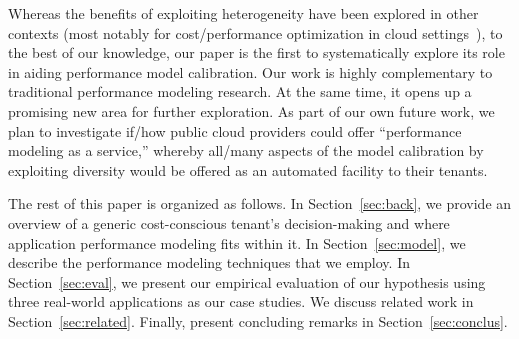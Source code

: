 Whereas the benefits of exploiting heterogeneity have been explored in other contexts (most notably for cost/performance optimization in cloud settings~\cite{DBLP:conf/cloud/ReissTGKK12,Zhang15,Farley:2012:MYM:2391229.2391249,DBLP:conf/hotcloud/LeeK11}), to the best of our knowledge, our paper is the first to systematically explore its role in aiding performance model calibration. %
Our work is highly complementary to traditional performance modeling research. At the same time, it opens up a promising new area for further exploration. As part of our own future work, we plan to investigate if/how public cloud providers could offer ``performance modeling as a service,'' whereby all/many aspects of the model calibration by exploiting diversity would be offered as an automated facility to their tenants. 



The rest of this paper is organized as follows. In Section~\ref{sec:back}, we provide an overview of a generic cost-conscious tenant's decision-making and where application performance modeling fits within it.  In Section~\ref{sec:model}, we describe the performance modeling techniques that we employ.  In Section~\ref{sec:eval}, we present our empirical evaluation of our hypothesis using three real-world applications as our case studies. We discuss related work in Section~\ref{sec:related}.  Finally, %
present concluding remarks in Section~\ref{sec:conclus}. 
 


 


